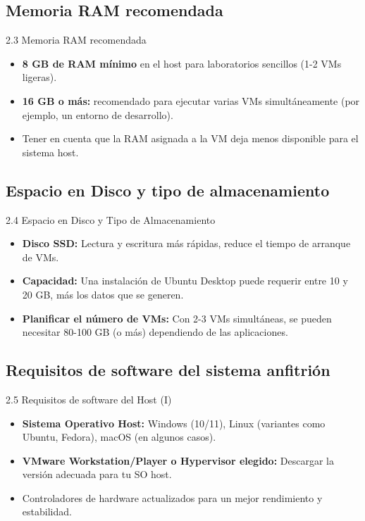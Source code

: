 \documentclass{beamer}
\begin{document}
\subsection{Memoria RAM recomendada}
\begin{frame}{2.3 Memoria RAM recomendada}
	\begin{itemize}
		\item \textbf{8 GB de RAM mínimo} en el host para laboratorios sencillos (1-2 VMs ligeras).
		\item \textbf{16 GB o más:} recomendado para ejecutar varias VMs simultáneamente (por ejemplo, un entorno de desarrollo).
		\item Tener en cuenta que la RAM asignada a la VM deja menos disponible para el sistema host.
	\end{itemize}
\end{frame}

\subsection{Espacio en Disco y tipo de almacenamiento}
\begin{frame}{2.4 Espacio en Disco y Tipo de Almacenamiento}
	\begin{itemize}
		\item \textbf{Disco SSD:} Lectura y escritura más rápidas, reduce el tiempo de arranque de VMs.
		\item \textbf{Capacidad:} Una instalación de Ubuntu Desktop puede requerir entre 10 y 20 GB, más los datos que se generen.
		\item \textbf{Planificar el número de VMs:} Con 2-3 VMs simultáneas, se pueden necesitar 80-100 GB (o más) dependiendo de las aplicaciones.
	\end{itemize}
\end{frame}

\subsection{Requisitos de software del sistema anfitrión}
\begin{frame}{2.5 Requisitos de software del Host (I)}
	\begin{itemize}
		\item \textbf{Sistema Operativo Host:} Windows (10/11), Linux (variantes como Ubuntu, Fedora), macOS (en algunos casos).
		\item \textbf{VMware Workstation/Player o Hypervisor elegido:} Descargar la versión adecuada para tu SO host.
		\item Controladores de hardware actualizados para un mejor rendimiento y estabilidad.
	\end{itemize}
\end{frame}
\end{document}
